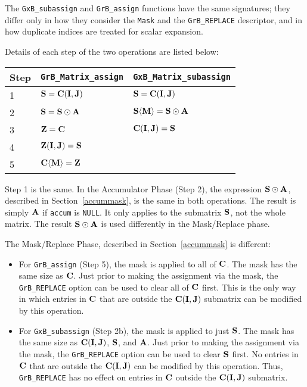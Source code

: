 \documentclass[12pt]{article}
\begin{document}
The \verb'GxB_subassign' and \verb'GrB_assign' functions have the same
signatures; they differ only in how they consider the \verb'Mask' and the
\verb'GrB_REPLACE' descriptor, and in how duplicate indices are treated for
scalar expansion.

Details of each step of the two operations are listed below:

\vspace{0.1in}
\begin{tabular}{lll}
\hline
Step & \verb'GrB_Matrix_assign'                & \verb'GxB_Matrix_subassign'                        \\
\hline
1 & ${\bf S} = {\bf C(I,J)}$                & ${\bf S} = {\bf C(I,J)}$                              \\
2 & ${\bf S} = {\bf S} \odot {\bf A}$       & ${\bf S \langle M \rangle} = {\bf S} \odot {\bf A}$   \\
3 & ${\bf Z} = {\bf C}$                     & ${\bf C(I,J)}= {\bf S}$                               \\
4 & ${\bf Z(I,J)} = {\bf S}$                &                                                       \\
5 & ${\bf C \langle M \rangle = Z}$         &                                                       \\
\hline
\end{tabular}
\vspace{0.1in}

Step 1 is the same.  In the Accumulator Phase (Step 2), the expression
${\bf S} \odot {\bf A}$,
described in Section~\ref{accummask}, is the same in both
operations.  The result is simply ${\bf A}$ if \verb'accum' is \verb'NULL'.  It
only applies to the submatrix ${\bf S}$, not the whole matrix.
The result ${\bf S} \odot {\bf A}$ is used differently in the Mask/Replace phase.

The Mask/Replace Phase, described in Section~\ref{accummask} is different:
\begin{itemize}
\item
    For \verb'GrB_assign' (Step 5), the mask is applied to all of ${\bf
    C}$.  The mask has the same size as ${\bf C}$.  Just prior to making the
    assignment via the mask, the \verb'GrB_REPLACE' option can be used to clear
    all of ${\bf C}$ first.  This is the only way in which entries in ${\bf C}$ that
    are outside the ${\bf C(I,J)}$ submatrix can be modified by this operation.

\item
    For \verb'GxB_subassign' (Step 2b), the mask is applied to just
    ${\bf S}$.  The mask has the same size as ${\bf C(I,J)}$, ${\bf S}$, and
    ${\bf A}$.  Just prior to making the assignment via the mask, the
    \verb'GrB_REPLACE' option can be used to clear ${\bf S}$ first.  No entries
    in ${\bf C}$ that are outside the ${\bf C(I,J)}$ can be modified by this
    operation.  Thus, \verb'GrB_REPLACE' has no effect on entries in ${\bf C}$
    outside the ${\bf C(I,J)}$ submatrix.

\end{itemize}
\end{document}
